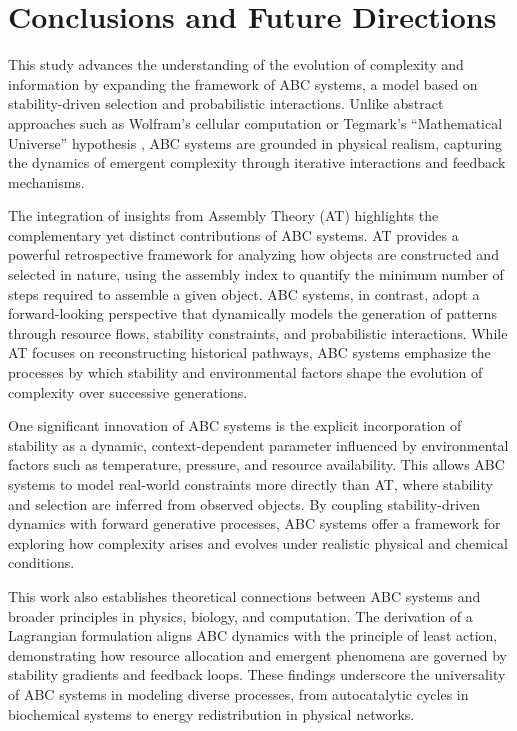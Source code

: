 \documentclass[entropy,article,submit,pdftex,oneauthor]{Definitions/mdpi}
\begin{document}
\section{Conclusions and Future Directions}

This study advances the understanding of the evolution of complexity and information by expanding the framework of ABC systems, a model based on stability-driven selection and probabilistic interactions. Unlike abstract approaches such as Wolfram’s cellular computation \cite{wolfram2020fundamental} or Tegmark’s “Mathematical Universe” hypothesis \cite{tegmark2008mathematical}, ABC systems are grounded in physical realism, capturing the dynamics of emergent complexity through iterative interactions and feedback mechanisms.

The integration of insights from Assembly Theory (AT) \cite{walker2023nature} highlights the complementary yet distinct contributions of ABC systems. AT provides a powerful retrospective framework for analyzing how objects are constructed and selected in nature, using the assembly index to quantify the minimum number of steps required to assemble a given object. ABC systems, in contrast, adopt a forward-looking perspective that dynamically models the generation of patterns through resource flows, stability constraints, and probabilistic interactions. While AT focuses on reconstructing historical pathways, ABC systems emphasize the processes by which stability and environmental factors shape the evolution of complexity over successive generations. 

One significant innovation of ABC systems is the explicit incorporation of stability as a dynamic, context-dependent parameter influenced by environmental factors such as temperature, pressure, and resource availability. This allows ABC systems to model real-world constraints more directly than AT, where stability and selection are inferred from observed objects. By coupling stability-driven dynamics with forward generative processes, ABC systems offer a framework for exploring how complexity arises and evolves under realistic physical and chemical conditions.

This work also establishes theoretical connections between ABC systems and broader principles in physics, biology, and computation. The derivation of a Lagrangian formulation aligns ABC dynamics with the principle of least action, demonstrating how resource allocation and emergent phenomena are governed by stability gradients and feedback loops. These findings underscore the universality of ABC systems in modeling diverse processes, from autocatalytic cycles in biochemical systems to energy redistribution in physical networks.
\end{document}

